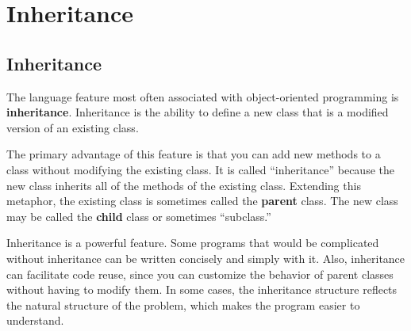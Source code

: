 


\chapter{Inheritance}

\section{Inheritance}

The language feature most often associated with object-oriented
programming is {\bf inheritance}.  Inheritance is the ability to
define a new class that is a modified version of an existing
class.

The primary advantage of this feature is that you can add new methods
to a class without modifying the existing class.  It is
called ``inheritance'' because the new class inherits all of the
methods of the existing class.  Extending this metaphor, the existing
class is sometimes called the {\bf parent} class.  The new class may
be called the {\bf child} class or sometimes ``subclass.''


Inheritance is a powerful feature.  Some programs that would be
complicated without inheritance can be written concisely and simply
with it.  Also, inheritance can facilitate code reuse, since you can
customize the behavior of parent classes without having to modify
them.  In some cases, the inheritance structure reflects the natural
structure of the problem, which makes the program easier to
understand.

